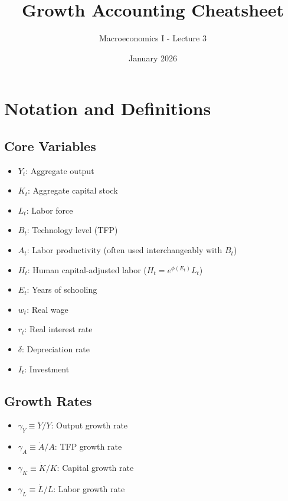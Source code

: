 \documentclass[a4paper,11pt]{article}
\newcommand{\gammay}{\gamma_Y}
\newcommand{\gammaA}{\gamma_A}
\newcommand\gammaK{\gamma_K}
\newcommand\gammaL{\gamma_L}
\begin{document}
\title{Growth Accounting Cheatsheet}
\author{Macroeconomics I - Lecture 3}
\date{January 2026}

\maketitle

\tableofcontents

\newpage

\section{Notation and Definitions}

\subsection*{Core Variables}
\begin{itemize}
    \item $Y_t$: Aggregate output
    \item $K_t$: Aggregate capital stock
    \item $L_t$: Labor force
    \item $B_t$: Technology level (TFP)
    \item $A_t$: Labor productivity (often used interchangeably with $B_t$)
    \item $H_t$: Human capital-adjusted labor ($H_t = e^{\phi(E_t)}L_t$)
    \item $E_t$: Years of schooling
    \item $w_t$: Real wage
    \item $r_t$: Real interest rate
    \item $\delta$: Depreciation rate
    \item $I_t$: Investment
\end{itemize}

\subsection*{Growth Rates}
\begin{itemize}
    \item $\gammay \equiv \dot{Y}/Y$: Output growth rate
    \item $\gammaA \equiv \dot{A}/A$: TFP growth rate
    \item $\gammaK \equiv \dot{K}/K$: Capital growth rate
    \item $\gammaL \equiv \dot{L}/L$: Labor growth rate
\end{itemize}
\end{document}

